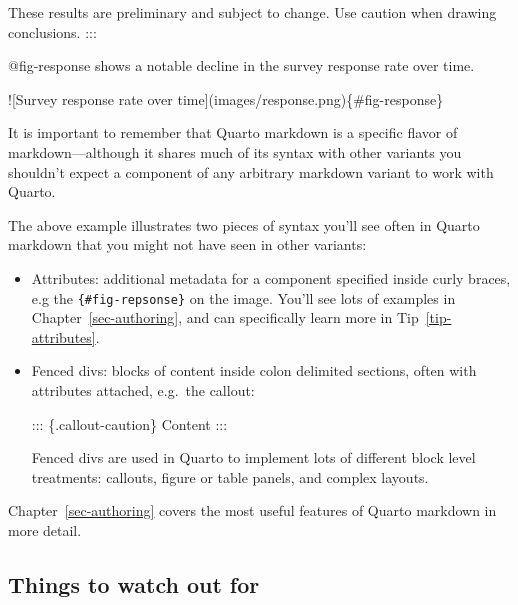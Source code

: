 \documentclass[
  letterpaper,
  DIV=11,
  numbers=noendperiod,
  oneside]{scrreprt}
\newenvironment{Shaded}{\begin{snugshade}}{\end{snugshade}}
\newcommand{\AlertTok}[1]{\textcolor[rgb]{0.68,0.00,0.00}{#1}}
\newcommand{\NormalTok}[1]{\textcolor[rgb]{0.00,0.23,0.31}{#1}}
\begin{document}
\begin{tcolorbox}
\begin{codelisting}[H]
\begin{Shaded}
\begin{Highlighting}[]
\NormalTok{These results are preliminary and subject to change. Use caution when drawing conclusions.}
\NormalTok{:::}

\NormalTok{@fig{-}response shows a notable decline in the survey response rate over time.}

\AlertTok{![Survey response rate over time](images/response.png)}\NormalTok{\{\#fig{-}response\}}
\end{Highlighting}
\end{Shaded}

\end{codelisting}

It is important to remember that Quarto markdown is a specific flavor of
markdown---although it shares much of its syntax with other variants you
shouldn't expect a component of any arbitrary markdown variant to work
with Quarto.

The above example illustrates two pieces of syntax you'll see often in
Quarto markdown that you might not have seen in other variants:

\begin{itemize}
\item
  Attributes: additional metadata for a component specified inside curly
  braces, e.g the \texttt{\{\#fig-repsonse\}} on the image. You'll see
  lots of examples in Chapter~\ref{sec-authoring}, and can specifically
  learn more in Tip~\ref{tip-attributes}.
\item
  Fenced divs: blocks of content inside colon delimited sections, often
  with attributes attached, e.g.~the callout:

\begin{Shaded}
\begin{Highlighting}[]
\NormalTok{::: \{.callout{-}caution\}}
\NormalTok{Content}
\NormalTok{:::}
\end{Highlighting}
\end{Shaded}

  Fenced divs are used in Quarto to implement lots of different block
  level treatments: callouts, figure or table panels, and complex
  layouts.
\end{itemize}

Chapter~\ref{sec-authoring} covers the most useful features of Quarto
markdown in more detail.

\subsection{Things to watch out for}\label{things-to-watch-out-for}


\end{tcolorbox}
\end{document}
